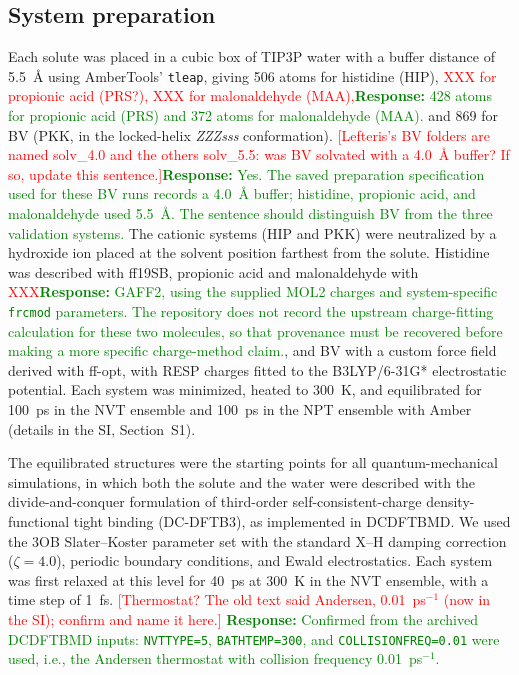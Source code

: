 \subsection{System preparation}

Each solute was placed in a cubic box of TIP3P water\cite{jorgensenComparisonSimplePotential1983} with a buffer distance of 5.5~\AA{} using AmberTools' \texttt{tleap},\cite{case_ambertools_2023} giving 506 atoms for histidine (HIP), \textcolor{red}{XXX for propionic acid (PRS?), XXX for malonaldehyde (MAA),}\textcolor{green}{\textbf{Response:} 428 atoms for propionic acid (PRS) and 372 atoms for malonaldehyde (MAA).} and 869 for BV (PKK, in the locked-helix \textit{ZZZsss} conformation\cite{tongManyRoadsSeam2026}). \textcolor{red}{[Lefteris's BV folders are named solv\_4.0 and the others solv\_5.5: was BV solvated with a 4.0~\AA{} buffer? If so, update this sentence.]}\textcolor{green}{\textbf{Response:} Yes. The saved preparation specification used for these BV runs records a 4.0~\AA{} buffer; histidine, propionic acid, and malonaldehyde used 5.5~\AA{}. The sentence should distinguish BV from the three validation systems.}
The cationic systems (HIP and PKK) were neutralized by a hydroxide ion placed at the solvent position farthest from the solute.
Histidine was described with ff19SB,\cite{tianFf19SBAminoAcidSpecificProtein2020} propionic acid and malonaldehyde with \textcolor{red}{XXX}\textcolor{green}{\textbf{Response:} GAFF2, using the supplied MOL2 charges and system-specific \texttt{frcmod} parameters. The repository does not record the upstream charge-fitting calculation for these two molecules, so that provenance must be recovered before making a more specific charge-method claim.}, and BV with a custom force field derived with ff-opt,\cite{curtisRobustAutomatedForce2026} with RESP\cite{baylyWellbehavedElectrostaticPotential1993} charges fitted to the B3LYP/6-31G* electrostatic potential.
Each system was minimized, heated to 300~K, and equilibrated for 100~ps in the NVT ensemble and 100~ps in the NPT ensemble with Amber\cite{caseAmber20252025} (details in the SI, Section~S1).

The equilibrated structures were the starting points for all quantum-mechanical simulations, in which both the solute and the water were described with the divide-and-conquer formulation\cite{nakai_divide-and-conquer_2023} of third-order self-consistent-charge density-functional tight binding (DC-DFTB3),\cite{gausDensityFunctionalTight2014} as implemented in DCDFTBMD.\cite{nishimura_dcdftbmd_2019}
We used the 3OB Slater--Koster parameter set with the standard X--H damping correction ($\zeta=4.0$),\cite{gaus_parameterization_2014} periodic boundary conditions, and Ewald electrostatics.
Each system was first relaxed at this level for 40~ps at 300~K in the NVT ensemble, with a time step of 1~fs. \textcolor{red}{[Thermostat? The old text said Andersen, 0.01~ps$^{-1}$ (now in the SI); confirm and name it here.]}
\textcolor{green}{\textbf{Response:} Confirmed from the archived DCDFTBMD inputs: \texttt{NVTTYPE=5}, \texttt{BATHTEMP=300}, and \texttt{COLLISIONFREQ=0.01} were used, i.e., the Andersen thermostat with collision frequency 0.01~ps$^{-1}$.}

